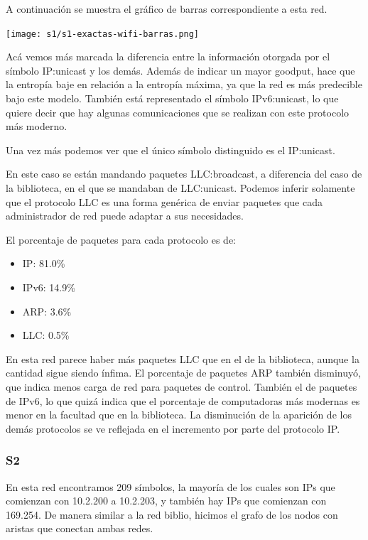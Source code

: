 A continuación se muestra el gráfico de barras correspondiente a esta red.

\begin{center}
\texttt{[image: s1/s1-exactas-wifi-barras.png]}
\end{center}

Acá vemos más marcada la diferencia entre la información otorgada por el
símbolo IP:unicast y los demás. Además de indicar un mayor goodput, 
hace que la entropía baje en relación a la entropía máxima, ya que la
red es más predecible bajo este modelo. También está representado el
símbolo IPv6:unicast, lo que quiere decir que hay algunas comunicaciones
que se realizan con este protocolo más moderno.


Una vez más podemos ver que el único símbolo distinguido es el IP:unicast.


En este caso se están mandando paquetes LLC:broadcast, a diferencia del caso
de la biblioteca, en el que se mandaban de LLC:unicast. Podemos inferir solamente
que el protocolo LLC es una forma genérica de enviar paquetes que cada administrador
de red puede adaptar a sus necesidades.


El porcentaje de paquetes para cada protocolo es de:
\begin{itemize}
\item IP: 81.0\%
\item IPv6: 14.9\%
\item ARP: 3.6\%
\item LLC: 0.5\%
\end{itemize}

En esta red parece haber más paquetes LLC que en el de la biblioteca, aunque la 
cantidad sigue siendo ínfima. El porcentaje de paquetes ARP también disminuyó,
que indica menos carga de red para paquetes de control. También el de paquetes
de IPv6, lo que quizá indica que el porcentaje de computadoras más modernas
es menor en la facultad que en la biblioteca. La disminución de la aparición
de los demás protocolos se ve reflejada en el incremento por parte del protocolo
IP.

\subsubsection{S2}
En esta red encontramos 209 símbolos, la mayoría de los cuales son IPs
que comienzan con 10.2.200 a 10.2.203, y también hay IPs que comienzan
con 169.254. De manera similar a la red biblio, hicimos el grafo de
los nodos con aristas que conectan ambas redes.

